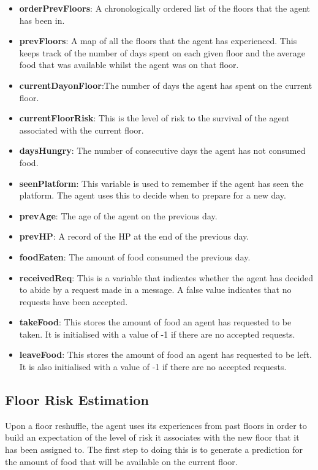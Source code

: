 \begin{itemize}

\item  \textbf{orderPrevFloors}: A chronologically ordered list of the floors that the agent has been in. 
\item  \textbf{prevFloors}: A map of all the floors that the agent has experienced. This keeps track of the number of days spent on each given floor and the average food that was available whilst the agent was on that floor.
\item  \textbf{currentDayonFloor}:The number of days the agent has spent on the current floor.
\item  \textbf{currentFloorRisk}: This is the level of risk to the survival of the agent associated with the current floor. 

\item  \textbf{daysHungry}: The number of consecutive days the agent has not consumed food.
\item  \textbf{seenPlatform}: This variable is used to remember if the agent has seen the platform. The agent uses this to decide when to prepare for a new day.
\item  \textbf{prevAge}: The age of the agent on the previous day.
\item  \textbf{prevHP}: A record of the HP at the end of the previous day.
\item  \textbf{foodEaten}: The amount of food consumed the previous day.
\item  \textbf{receivedReq}: This is a variable that indicates whether the agent has decided to abide by a request made in a message. A false value indicates that no requests have been accepted. 
\item  \textbf{takeFood}: This stores the amount of food an agent has requested to be taken. It is initialised with a value of -1 if there are no accepted requests.
\item  \textbf{leaveFood}: This stores the amount of food an agent has requested to be left. It is also initialised with a value of -1 if there are no accepted requests.

\end{itemize}

\subsection{Floor Risk Estimation}
\label{subsec: Floor Map}

Upon a floor reshuffle, the agent uses its experiences from past floors in order to build an expectation of the level of risk it associates with the new floor that it has been assigned to. The first step to doing this is to generate a prediction for the amount of food that will be available on the current floor. 

